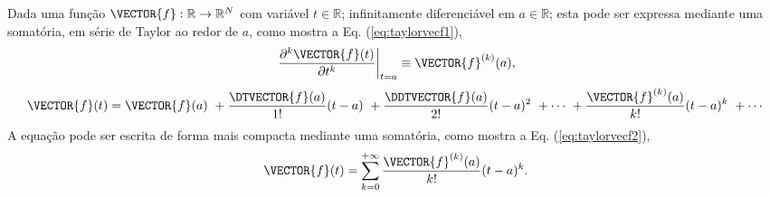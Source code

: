 \begin{proposition}\label{prop:taylorvecf}
Dada uma função $\VECTOR{f}:\mathbb{R}\rightarrow \mathbb{R}^{N}$ com variável $t \in \mathbb{R}$;
infinitamente diferenciável em $a \in \mathbb{R}$;
esta pode ser expressa mediante uma somatória, em série de Taylor 
\cite[pp. 264]{joag2016introduction}
ao redor de $a$, como
mostra a Eq. (\ref{eq:taylorvecf1}),
\begin{equation}\label{eq:taylorvecf0a}
\left.\frac{\partial^k \VECTOR{f}(t)}{\partial t^k}\right|_{t=a}\equiv \VECTOR{f}^{(k)}(a), 
\end{equation}
\begin{equation}\label{eq:taylorvecf1}
  \VECTOR{f}(t)=\VECTOR{f}(a)
      ~+\frac{\DTVECTOR{f}(a)}{1!} (t-a)
      ~+\frac{\DDTVECTOR{f}(a)}{2!} (t-a)^{2}
      ~+\cdots 
      ~+\frac{\VECTOR{f}^{(k)}(a)}{k!} (t-a)^{k}
      ~+\cdots 
\end{equation}
A equação pode ser escrita de forma mais compacta mediante uma somatória, como mostra a Eq. (\ref{eq:taylorvecf2}),
\begin{equation}\label{eq:taylorvecf2}
  \VECTOR{f}(t)=\sum\limits_{k=0}^{+\infty} \frac{\VECTOR{f}^{(k)}(a)}{k!} (t-a)^{k}.
\end{equation}
\end{proposition}

